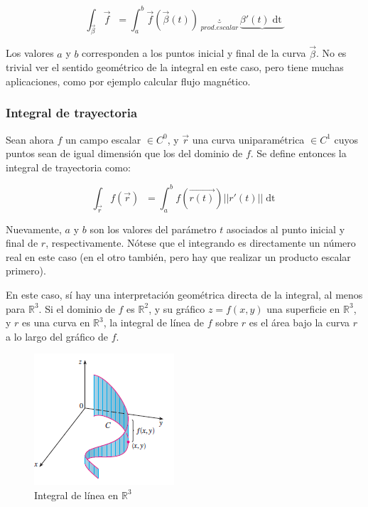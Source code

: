 \documentclass{article}
\renewcommand{\Bbb}{\mathbb}
\begin{document}
\begin{equation}
\int_{\overrightarrow{\beta}} \overrightarrow{f} \mathop{\overrightarrow{d\beta}} = \int_{a}^{b} \overrightarrow{f}(\overrightarrow{\beta}(t)) \underbrace{\cdot}_{prod. escalar} \underbrace{ \beta '(t) \mathop{dt} }_{\mathop{\overrightarrow{d\beta}}}
\end{equation}

Los valores $a$ y $b$ corresponden a los puntos inicial y final de la curva $\overrightarrow{\beta}$. No es trivial ver el sentido geométrico de la integral en este caso, pero tiene muchas aplicaciones, como por ejemplo calcular flujo magnético.

\subsubsection{Integral de trayectoria}

Sean ahora $f$ un campo escalar $\in C^0$, y $\overrightarrow{r}$ una curva uniparamétrica $\in C^1$ cuyos puntos sean de igual dimensión que los del dominio de $f$. Se define entonces la integral de trayectoria como:

\begin{equation}
\int_{\overrightarrow{r}} f(\overrightarrow{r}) \mathop{\overrightarrow{dr}} = \int_{a}^{b} f(\overrightarrow{r(t)}) ||r'(t)|| \mathop{dt}
\end{equation}

Nuevamente, $a$ y $b$ son los valores del parámetro $t$ asociados al punto inicial y final de $r$, respectivamente. Nótese que el integrando es directamente un número real en este caso (en el otro también, pero hay que realizar un producto escalar primero).

En este caso, sí hay una interpretación geométrica directa de la integral, al menos para $\Bbb R^3$. Si el dominio de $f$ es $\Bbb R^2$, y su gráfico $z = f(x,y)$ una superficie en $\Bbb R^3$, y $r$ es una curva en $\Bbb R^3$, la integral de línea de $f$ sobre $r$ es el área bajo la curva $r$ a lo largo del gráfico de $f$.

\begin{figure}[ht]
\caption{Integral de línea en $\Bbb R^3$}
\centering
\includegraphics[scale=0.6]{img/integrales/integral_linea.png} 
\end{figure}
\end{document}
